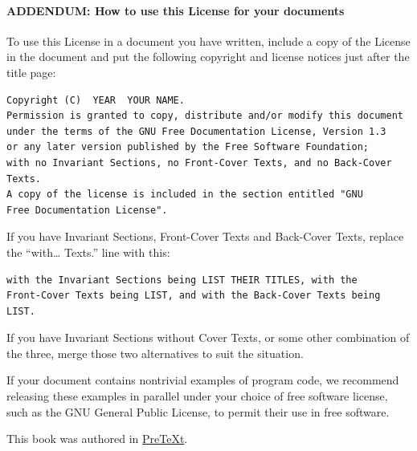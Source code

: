 \documentclass[10pt,]{book}
\theoremstyle{plain}
\theoremstyle{definition}
\theoremstyle{definition}
\theoremstyle{definition}
\theoremstyle{definition}
\numberwithin{equation}{section}
\begin{document}
\paragraph[{ADDENDUM: How to use this License for your documents}]{ADDENDUM: How to use this License for your documents}\hypertarget{gfdl-addendum}{}
To use this License in a document you have written, include a copy of the License in the document and put the following copyright and license notices just after the title page:%
\begin{verbatim}
Copyright (C)  YEAR  YOUR NAME.
Permission is granted to copy, distribute and/or modify this document
under the terms of the GNU Free Documentation License, Version 1.3
or any later version published by the Free Software Foundation;
with no Invariant Sections, no Front-Cover Texts, and no Back-Cover Texts.
A copy of the license is included in the section entitled "GNU
Free Documentation License".
\end{verbatim}
If you have Invariant Sections, Front-Cover Texts and Back-Cover Texts, replace the ``with\dots{} Texts.'' line with this:%
\begin{verbatim}
with the Invariant Sections being LIST THEIR TITLES, with the
Front-Cover Texts being LIST, and with the Back-Cover Texts being LIST.
\end{verbatim}
If you have Invariant Sections without Cover Texts, or some other combination of the three, merge those two alternatives to suit the situation.%
\par
If your document contains nontrivial examples of program code, we recommend releasing these examples in parallel under your choice of free software license, such as the GNU General Public License, to permit their use in free software.%
%
\backmatter
%
\cleardoublepage
\pagestyle{empty}
\centerline{This book was authored in \href{http://mathbook.pugetsound.edu}{PreTeXt}.%
}
\end{document}
